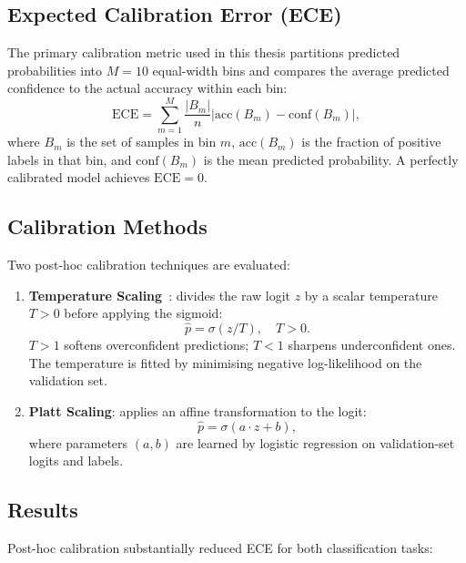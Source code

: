 \documentclass[a4paper,11pt,twoside]{report}
\begin{document}
\subsection*{Expected Calibration Error (ECE)}

The primary calibration metric used in this thesis partitions predicted probabilities into $M = 10$ equal-width bins and compares the average predicted confidence to the actual accuracy within each bin:
\begin{equation}
\text{ECE} = \sum_{m=1}^{M} \frac{|B_m|}{n} \left| \text{acc}(B_m) - \text{conf}(B_m) \right|,
\end{equation}
where $B_m$ is the set of samples in bin $m$, $\text{acc}(B_m)$ is the fraction of positive labels in that bin, and $\text{conf}(B_m)$ is the mean predicted probability. A perfectly calibrated model achieves $\text{ECE} = 0$.

\subsection*{Calibration Methods}

Two post-hoc calibration techniques are evaluated:

\begin{enumerate}
\item \textbf{Temperature Scaling}~\cite{guo2017}: divides the raw logit $z$ by a scalar temperature $T > 0$ before applying the sigmoid:
\begin{equation}
\hat{p} = \sigma(z / T), \quad T > 0.
\end{equation}
$T > 1$ softens overconfident predictions; $T < 1$ sharpens underconfident ones. The temperature is fitted by minimising negative log-likelihood on the validation set.

\item \textbf{Platt Scaling}: applies an affine transformation to the logit:
\begin{equation}
\hat{p} = \sigma(a \cdot z + b),
\end{equation}
where parameters $(a, b)$ are learned by logistic regression on validation-set logits and labels.
\end{enumerate}

\subsection*{Results}

Post-hoc calibration substantially reduced ECE for both classification tasks:
\end{document}
